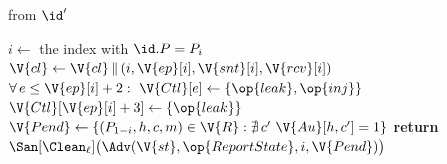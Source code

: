 \begin{interface}
{ \quad from $\id'$
\begin{algorithmic}[1]
\algcont
{}
\State $i \gets$ the index with $\id.P = P_i$
\State $\V{cl} \gets \V{cl} \, \| \, (i, \V{ep}[i], \V{snt}[i], \V{rcv}[i])$ \label{ln:smdeadvar}
\State $\forall\, e \leq \V{ep}[i] + 2 : \ \V{Ctl}[e] \gets \{\op{leak}, \op{inj}\}$ \label{ln:smwiden}
\State $\V{Ctl}[\V{ep}[i] + 3] \gets \{\op{leak}\}$ \label{ln:smthird}
\State $\V{Pend} \gets \{(P_{1-i}, h, c, m) \in \V{R} : \nexists\, c' \ \V{Au}[h, c'] = 1\}$ \label{ln:smpending}
\State \textbf{return} $\San[\Clean_{\ell}]\bigl(\Adv(\V{st}, \op{ReportState}, i, \V{Pend})\bigr)$ \label{ln:smreport}
\algsave
\end{algorithmic}}
\end{interface}
